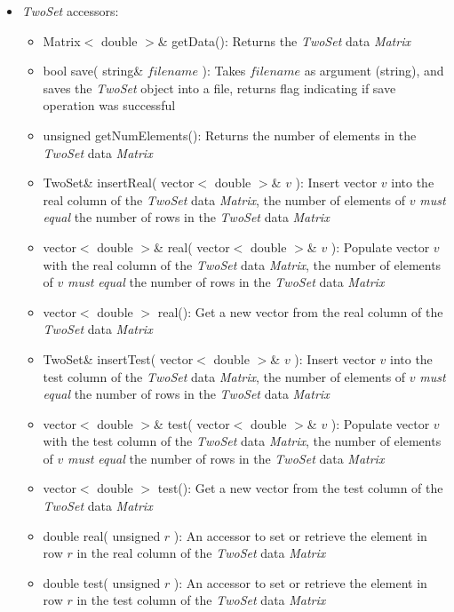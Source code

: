 \documentclass{report}
\begin{document}
\begin{itemize}
\begin{itemize}
\item {\em TwoSet} accessors:
\begin{itemize}
\item Matrix$<$ double $>$\& getData(): Returns the {\em TwoSet} data
      {\em Matrix}
\item bool save( string\& $filename$ ): Takes $filename$ as argument
      (string), and saves the {\em TwoSet} object into a file, returns
      flag indicating if save operation was successful
\item unsigned getNumElements(): Returns the number of elements in the
      {\em TwoSet} data {\em Matrix}
\item TwoSet\& insertReal( vector$<$ double $>$\& $v$ ): Insert vector
      $v$ into the real column of the {\em TwoSet} data {\em Matrix},
      the number of elements of $v$ {\em must equal} the number of
      rows in the {\em TwoSet} data {\em Matrix}
\item vector$<$ double $>$\& real( vector$<$ double $>$\& $v$ ):
      Populate vector $v$ with the real column of the {\em TwoSet}
      data {\em Matrix}, the number of elements of $v$ {\em must
      equal} the number of rows in the {\em TwoSet} data {\em Matrix}
\item vector$<$ double $>$ real(): Get a new vector from the real
      column of the {\em TwoSet} data {\em Matrix}
\item TwoSet\& insertTest( vector$<$ double $>$\& $v$ ): Insert vector
      $v$ into the test column of the {\em TwoSet} data {\em Matrix},
      the number of elements of $v$ {\em must equal} the number of
      rows in the {\em TwoSet} data {\em Matrix}
\item vector$<$ double $>$\& test( vector$<$ double $>$\& $v$ ):
      Populate vector $v$ with the test column of the {\em TwoSet}
      data {\em Matrix}, the number of elements of $v$ {\em must
      equal} the number of rows in the {\em TwoSet} data {\em Matrix}
\item vector$<$ double $>$ test(): Get a new vector from the test
      column of the {\em TwoSet} data {\em Matrix}
\item double real( unsigned $r$ ): An accessor to set or retrieve the
      element in row $r$ in the real column of the {\em TwoSet} data
      {\em Matrix}
\item double test( unsigned $r$ ): An accessor to set or retrieve the
      element in row $r$ in the test column of the {\em TwoSet} data
      {\em Matrix}
\end{itemize}


\end{itemize}
\end{itemize}
\end{document}

